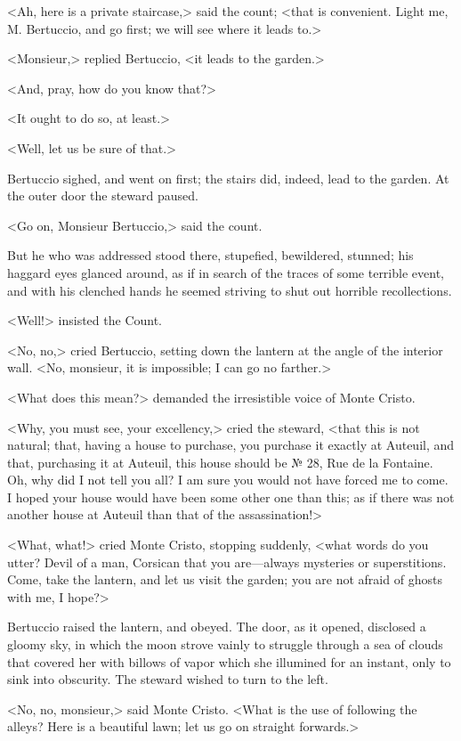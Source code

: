  <Ah, here is a private staircase,> said the count; <that is convenient. Light me, M. Bertuccio, and go first; we will see where it leads to.> 

 <Monsieur,> replied Bertuccio, <it leads to the garden.> 

 <And, pray, how do you know that?> 

 <It ought to do so, at least.> 

 <Well, let us be sure of that.> 

 Bertuccio sighed, and went on first; the stairs did, indeed, lead to the garden. At the outer door the steward paused. 

 <Go on, Monsieur Bertuccio,> said the count. 

 But he who was addressed stood there, stupefied, bewildered, stunned; his haggard eyes glanced around, as if in search of the traces of some terrible event, and with his clenched hands he seemed striving to shut out horrible recollections. 

 <Well!> insisted the Count. 

 <No, no,> cried Bertuccio, setting down the lantern at the angle of the interior wall. <No, monsieur, it is impossible; I can go no farther.> 

 <What does this mean?> demanded the irresistible voice of Monte Cristo. 

 <Why, you must see, your excellency,> cried the steward, <that this is not natural; that, having a house to purchase, you purchase it exactly at Auteuil, and that, purchasing it at Auteuil, this house should be № 28, Rue de la Fontaine. Oh, why did I not tell you all? I am sure you would not have forced me to come. I hoped your house would have been some other one than this; as if there was not another house at Auteuil than that of the assassination!> 

 <What, what!> cried Monte Cristo, stopping suddenly, <what words do you utter? Devil of a man, Corsican that you are—always mysteries or superstitions. Come, take the lantern, and let us visit the garden; you are not afraid of ghosts with me, I hope?> 

 Bertuccio raised the lantern, and obeyed. The door, as it opened, disclosed a gloomy sky, in which the moon strove vainly to struggle through a sea of clouds that covered her with billows of vapor which she illumined for an instant, only to sink into obscurity. The steward wished to turn to the left. 

 <No, no, monsieur,> said Monte Cristo. <What is the use of following the alleys? Here is a beautiful lawn; let us go on straight forwards.> 

